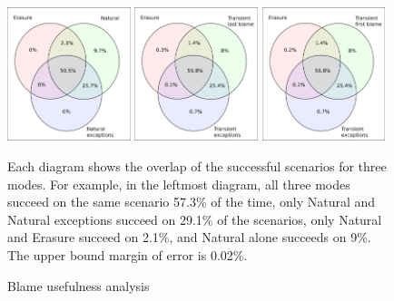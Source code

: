 \begin{figure}\footnotesize 
  \centering
  \includegraphics[width=0.32\textwidth]{./plots/TR-TR-stack-first-venn}
  \hfill
  \includegraphics[width=0.32\textwidth]{./plots/transient-newest-transient-stack-first-venn}
  \hfill
  \includegraphics[width=0.32\textwidth]{./plots/transient-oldest-transient-stack-first-venn}

  \vspace{1em}
  \begin{minipage}{0.95\textwidth}

     Each diagram shows the overlap of the successful scenarios for three modes.
     For example, in the leftmost diagram, all three modes succeed on the same
     scenario 57.3\% of the time, only Natural and Natural exceptions succeed on
     29.1\% of the scenarios, only Natural and Erasure succeed on 2.1\%, and
     Natural alone succeeds on 9\%.  \\ The upper bound margin of error is 0.02\%.

  \end{minipage}

  \caption{Blame usefulness analysis}
  \label{fig:success-venns}
\end{figure}


